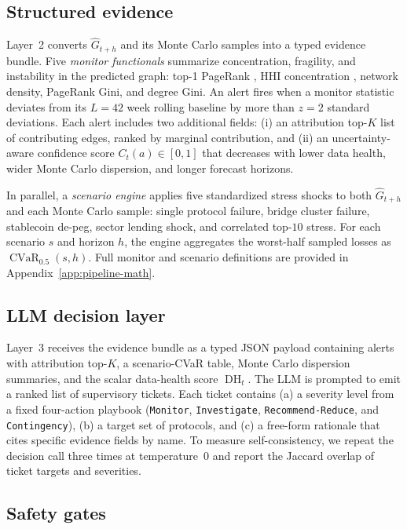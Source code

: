 \subsection{Structured evidence}
\label{ssec:evidence}

Layer~2 converts $\widehat{G}_{t+h}$ and its Monte Carlo samples into a typed
evidence bundle. Five \emph{monitor functionals} summarize concentration,
fragility, and instability in the predicted graph: top-1 PageRank
\citep{BrinPage1998PageRank}, HHI concentration
\citep{Rhoades1993HHI}, network density, PageRank Gini, and degree Gini. An
alert fires when a monitor statistic deviates from its $L=42$ week rolling
baseline by more than $z=2$ standard deviations. Each alert includes two
additional fields: (i) an attribution top-$K$ list of contributing edges,
ranked by marginal contribution, and (ii) an uncertainty-aware confidence
score $C_t(a)\in[0,1]$ that decreases with lower data health, wider Monte
Carlo dispersion, and longer forecast horizons.

In parallel, a \emph{scenario engine} applies five standardized stress
shocks to both $\widehat{G}_{t+h}$ and each Monte Carlo sample: single
protocol failure, bridge cluster failure, stablecoin de-peg, sector lending
shock, and correlated top-$10$ stress. For each scenario $s$ and horizon
$h$, the engine aggregates the worst-half sampled losses as
$\operatorname{CVaR}_{0.5}(s,h)$. Full monitor and scenario definitions are
provided in Appendix~\ref{app:pipeline-math}.

\subsection{LLM decision layer}
\label{ssec:llm-decision}

Layer~3 receives the evidence bundle as a typed JSON payload containing
alerts with attribution top-$K$, a scenario-CVaR table, Monte Carlo
dispersion summaries, and the scalar data-health score $\operatorname{DH}_t$.
The LLM is prompted to emit a ranked list of supervisory tickets. Each ticket
contains (a) a severity level from a fixed four-action playbook
(\texttt{Monitor}, \texttt{Investigate}, \texttt{Recommend-Reduce}, and
\texttt{Contingency}), (b) a target set of protocols, and (c) a free-form
rationale that cites specific evidence fields by name. To measure
self-consistency, we repeat the decision call three times at temperature~$0$
and report the Jaccard overlap of ticket targets and severities.

\subsection{Safety gates}
\label{ssec:gates}

